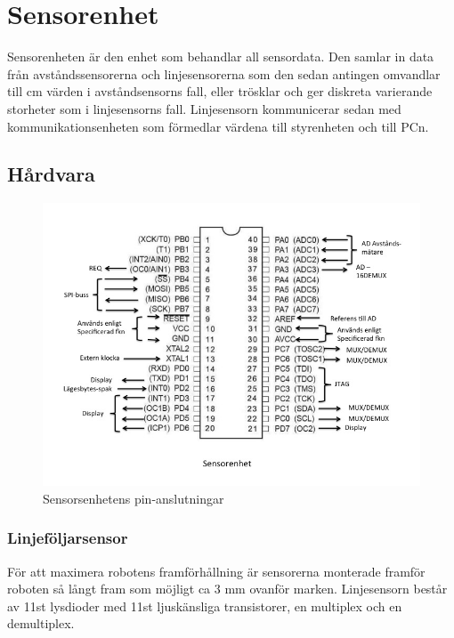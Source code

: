 
\section{Sensorenhet}

Sensorenheten är den enhet som behandlar all sensordata. Den samlar in data från 
avståndssensorerna och linjesensorerna som den sedan antingen omvandlar till 
cm värden i avståndsensorns fall, eller trösklar och ger diskreta varierande storheter 
som i linjesensorns fall. Linjesensorn kommunicerar sedan med kommunikationsenheten
som förmedlar värdena till styrenheten och till PCn.

\subsection{Hårdvara}

\begin{figure}[H]
  \centering
 \includegraphics[angle=0,scale=0.5]{bilder/PIN_sensor.jpg}
  \caption{Sensorsenhetens pin-anslutningar}
  \label{fig:PINsensor}
\end{figure}

\subsubsection{Linjeföljarsensor}
För att maximera robotens framförhållning är sensorerna monterade framför roboten 
så långt fram som möjligt ca 3 mm ovanför marken. Linjesensorn består av 11st lysdioder 
med 11st ljuskänsliga transistorer, en multiplex och en demultiplex.

